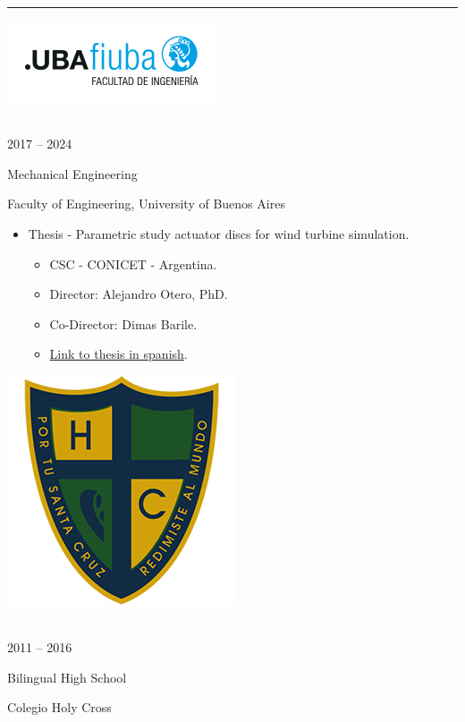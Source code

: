 \documentclass[a4paper,10pt]{article}
\newlength{\cvcolumngapwidth}
\newlength{\cvleftcolumnwidth}
\newlength{\cvrightcolumnwidth}
\newcommand{\cvsectionstyle}[1]{{\normalsize\cvsectionfont\textcolor{cvsectioncolor}{#1}}}
\newcommand{\cvtitlestyle}[1]{{\large\cvtitlefont\textcolor{cvtitlecolor}{#1}}}
\newcommand{\cvdurationstyle}[1]{{\small\cvdurationfont\textcolor{cvdurationcolor}{#1}}}
\newlength{\cvafteritemskipamount}
\newlength{\cvaftersectionskipamount}
\newlength{\cvaftertitleskipamount}
\newlength{\cvparskip}
\newcommand{\cvsection}[1]{
    \begin{minipage}[t]{\cvleftcolumnwidth}
        \raggedleft\cvsectionstyle{#1}
    \end{minipage}%
    \hspace{\cvcolumngapwidth}%
    \begin{minipage}[t]{\cvrightcolumnwidth}
        \textcolor{cvrulecolor}{\rule{\cvrightcolumnwidth}{0.3mm}}
    \end{minipage}

    \vspace{\cvaftersectionskipamount}
}
\newcommand{\cvitem}[2]{
    \begin{minipage}[t]{\cvleftcolumnwidth}
        \raggedleft #1
    \end{minipage}%
    \hspace{\cvcolumngapwidth}%
    \begin{minipage}[t]{\cvrightcolumnwidth}
        \setlength{\parskip}{\cvparskip} #2
    \end{minipage}

    \vspace{\cvafteritemskipamount}
}
\newcommand{\cvtitle}[1]{
    \cvtitlestyle{#1}

    \vspace{\cvaftertitleskipamount}
    \vspace{-\cvparskip}
}
\begin{document}

\cvsection{EDUCATION}

\cvitem{
 	\begin{minipage}{\textwidth}
   \begin{flushright}
		  \includegraphics[height=0.25\textwidth]{../logos-photos/Logo_FIUBA_new.png}   
    \end{flushright}  
  \end{minipage} \\
  \vspace{0.1cm}
  \cvdurationstyle{2017 -- 2024}
}{
  \cvtitle{Mechanical Engineering}

    Faculty of Engineering, University of Buenos Aires
    
    \begin{itemize}[leftmargin=*]
       \item \textsf{Thesis - Parametric study actuator discs for wind turbine simulation.} 
        \begin{itemize}
          \item CSC - CONICET - Argentina.
          \item Director: Alejandro Otero, PhD.
          \item Co-Director: Dimas Barile.
          \item \href{https://drive.google.com/file/d/1TWklGPKCdaIwJHuOc-fqAFvFS9hN7_sT/view?usp=sharing}{Link to thesis in spanish}.
        \end{itemize}
    \end{itemize}
}


\cvitem{
    \begin{minipage}{\textwidth}
        \flushright
        \includegraphics[height=0.2\textwidth]{../logos-photos/Logo_HC.png}   
    \end{minipage}\\  
    \vspace{0.1cm}
    \cvdurationstyle{2011 -- 2016}
}{
    \cvtitle{Bilingual High School}

    Colegio Holy Cross
}
\end{document}
